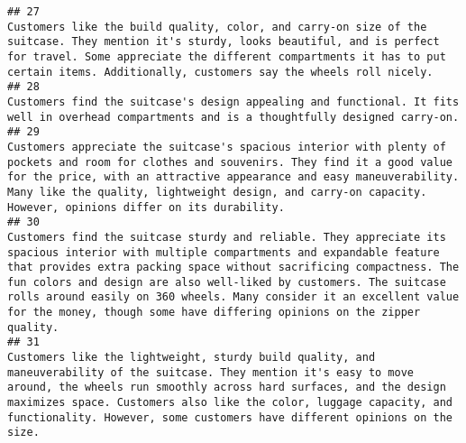 \documentclass[
]{article}
\begin{document}
\begin{verbatim}
## 27                                                                                                                                                                                                                                                                                                                                              Customers like the build quality, color, and carry-on size of the suitcase. They mention it's sturdy, looks beautiful, and is perfect for travel. Some appreciate the different compartments it has to put certain items. Additionally, customers say the wheels roll nicely.
## 28                                                                                                                                                                                                                                                                                                                                                                                                                                                                              Customers find the suitcase's design appealing and functional. It fits well in overhead compartments and is a thoughtfully designed carry-on.
## 29                                                                                                                                                                                                                                                                                            Customers appreciate the suitcase's spacious interior with plenty of pockets and room for clothes and souvenirs. They find it a good value for the price, with an attractive appearance and easy maneuverability. Many like the quality, lightweight design, and carry-on capacity. However, opinions differ on its durability.
## 30                                                                                                                                                                                      Customers find the suitcase sturdy and reliable. They appreciate its spacious interior with multiple compartments and expandable feature that provides extra packing space without sacrificing compactness. The fun colors and design are also well-liked by customers. The suitcase rolls around easily on 360 wheels. Many consider it an excellent value for the money, though some have differing opinions on the zipper quality.
## 31                                                                                                                                                                                                                                                                           Customers like the lightweight, sturdy build quality, and maneuverability of the suitcase. They mention it's easy to move around, the wheels run smoothly across hard surfaces, and the design maximizes space. Customers also like the color, luggage capacity, and functionality. However, some customers have different opinions on the size.

\end{verbatim}
\end{document}
